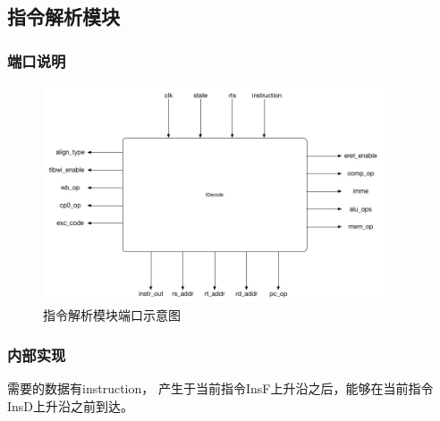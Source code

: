     \subsection{指令解析模块}
        \subsubsection{端口说明}
            
            \begin{figure}[!hbp]
                \centering
                \caption{指令解析模块端口示意图}
                \includegraphics[width=0.9\textwidth]{chart/idecode.jpg}
            \end{figure}

        \subsubsection{内部实现}
            需要的数据有instruction，%
            产生于当前指令InsF上升沿之后，能够在当前指令InsD上升沿之前到达。

